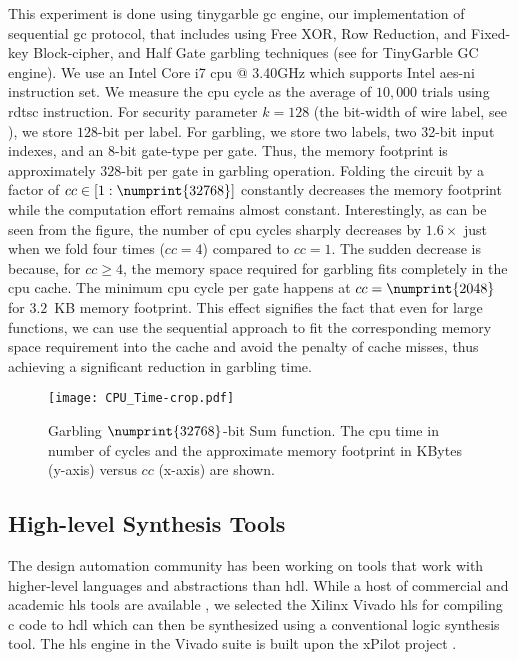 This experiment is done using \gls{tinygarble} \acrshort{gc} engine, our implementation of sequential \acrshort{gc} protocol, that includes using Free XOR, Row Reduction, and Fixed-key Block-cipher, and Half Gate garbling techniques (see  for TinyGarble GC engine).
We use an Intel Core i7 \acrshort{cpu} @ 3.40GHz which supports Intel \acrfull{aes-ni} instruction set.
We measure the \acrshort{cpu} cycle as the average of $10,000$ trials using \gls{rdtsc} instruction.
For security parameter $k=128$ (the bit-width of wire label, see ), we store $128$-bit per label.
For garbling, we store two labels, two 32-bit input indexes, and an 8-bit gate-type per gate.
Thus, the memory footprint is approximately $328$-bit per gate in garbling operation.
Folding the circuit by a factor of $cc \in [1:\numprint{32768}]$ constantly decreases the memory footprint while the computation effort remains almost constant.
Interestingly, as can be seen from the figure, the number of \acrshort{cpu} cycles sharply decreases by $1.6\times$ just when we fold four times ($cc=4$) compared to $cc=1$.
The sudden decrease is because, for $cc \geq 4$, the memory space required for garbling fits completely in the \acrshort{cpu} cache.
The minimum \acrshort{cpu} cycle per gate happens at $cc=\numprint{2048}$ for $3.2$~KB memory footprint.
This effect signifies the fact that even for large functions, we can use the sequential approach to fit the corresponding memory space requirement into the cache and avoid the penalty of cache misses, thus achieving a significant reduction in garbling time.

\begin{figure}
	\centering
	\texttt{[image: CPU\_Time-crop.pdf]}
	\caption{Garbling $\numprint{32768}$-bit Sum function.
The \acrshort{cpu} time in number of cycles and the approximate memory footprint in KBytes (y-axis) versus $cc$ (x-axis) are shown.}
	\label{fig:cpu_time}
\end{figure}

\subsection{High-level Synthesis Tools}\label{ssec:eval-tinygarble-high}
The design automation community has been working on tools that work with higher-level languages and abstractions than \acrfull{hdl}.
While a host of commercial and academic \acrfull{hls} tools are available \cite{tool:Vivado, tool:PandA, decaluwe2004myhdl, Gupta2004}, we selected the Xilinx Vivado \acrshort{hls} for compiling \gls{c} code to \acrshort{hdl} which can then be synthesized using a conventional logic synthesis tool.
The \acrshort{hls} engine in the Vivado suite is built upon the xPilot project \cite{Chapter:Zhang2008}.


